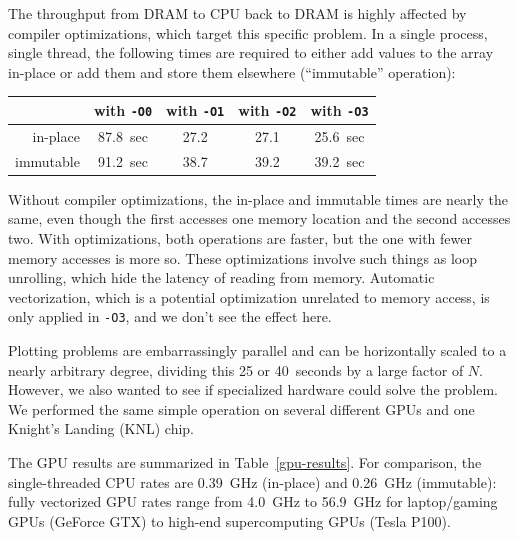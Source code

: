 \documentclass[12pt]{article}
\begin{document}
The throughput from DRAM to CPU back to DRAM is highly affected by compiler optimizations, which target this specific problem. In a single process, single thread, the following times are required to either add values to the array in-place or add them and store them elsewhere (``immutable'' operation):

\begin{center}
\begin{tabular}{r | c c c c}
           & with {\tt -O0} & with {\tt -O1} & with {\tt -O2} & with {\tt -O3} \\\hline
in-place   & 87.8~sec       & 27.2           & 27.1           & 25.6~sec       \\
immutable  & 91.2~sec       & 38.7           & 39.2           & 39.2~sec       \\
\end{tabular}
\end{center}

Without compiler optimizations, the in-place and immutable times are nearly the same, even though the first accesses one memory location and the second accesses two. With optimizations, both operations are faster, but the one with fewer memory accesses is more so. These optimizations involve such things as loop unrolling, which hide the latency of reading from memory. Automatic vectorization, which is a potential optimization unrelated to memory access, is only applied in {\tt -O3}, and we don't see the effect here.

Plotting problems are embarrassingly parallel and can be horizontally scaled to a nearly arbitrary degree, dividing this 25 or 40~seconds by a large factor of $N$. However, we also wanted to see if specialized hardware could solve the problem. We performed the same simple operation on several different GPUs and one Knight's Landing (KNL) chip.

The GPU results are summarized in Table~\ref{gpu-results}. For comparison, the single-threaded CPU rates are 0.39~GHz (in-place) and 0.26~GHz (immutable): fully vectorized GPU rates range from 4.0~GHz to 56.9~GHz for laptop/gaming GPUs (GeForce GTX) to high-end supercomputing GPUs (Tesla P100).
\end{document}
